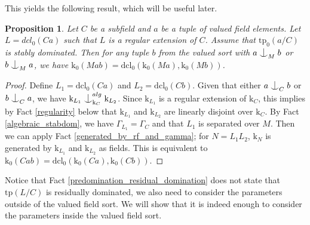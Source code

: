 \documentclass[12pt]{article}
\newcommand{\tpp}{\mathrm{tp}}
\newcommand{\dcl}{\mathrm{dcl}}
\newcommand{\0}{\emptyset}
\newcommand{\rf}{\mathrm{k}}
\newcommand{\A}{\mathcal{A}}
\newcommand{\U}{\mathcal{U}}
\def\forkindep{\mathrel{\raise0.2ex\hbox{\ooalign{\hidewidth$\vert$\hidewidth\cr\raise-0.9ex\hbox{$\smile$}}}}}
\theoremstyle{plain}%
\newtheorem{lem}[thm]{Lemma}
\newtheorem{prop}[thm]{Proposition}
\theoremstyle{definition}
\theoremstyle{remark}
\begin{document}
 This yields the following result, which will be useful later.
 \begin{prop}\label{dcl_in_k} Let $C$ be a subfield and $a$ be a tuple of valued field elements. Let $L=dcl_0(Ca)$ such that $L$ is a regular extension of $C$. Assume that $\tpp_0(a/C)$ is stably dominated. Then for any tuple $b$ from the valued sort with $a \forkindep_M b$ or $b \forkindep_M a$, we have $\rf_0(Mab) = \dcl_0(\rf_0(Ma), \rf_0(Mb))$. 


\end{prop}

\begin{proof}

Define $L_1=\dcl_0(Ca)$ and $L_2=\dcl_0(Cb)$. Given that either $a\forkindep_C b$ or $b\forkindep_C a$, we have $\rf_{L_1}\forkindep_{\rf_{C}}^{alg}\rf_{L_2}$. Since $\rf_{L_1}$ is a regular extension of $\rf_{C}$, this implies by Fact \ref{regularity} below that $\rf_{L_1}$ and $\rf_{L_2}$ are linearly disjoint over $\rf_C$. By Fact \ref{algebraic_stabdom}, we have $\Gamma_{L_1}=\Gamma_C$ and that $L_1$ is separated over $M$. Then we can apply Fact \ref{generated_by_rf_and_gamma}; for $N=L_1L_2$, $\rf_{N}$ is generated by $\rf_{L_1}$ and $\rf_{L_2}$ as fields. This is equivalent to $\rf_0(Cab)=\dcl_0(\rf_0(Ca), \rf_0(Cb))$. \end{proof}


Notice that Fact \ref{predomination_residual_domination} does not state that $\tpp(L/C)$ is residually dominated, we also need to consider the parameters outside of the valued field sort. We will show that it is indeed enough to consider the parameters inside the valued field sort. 
\end{document}
